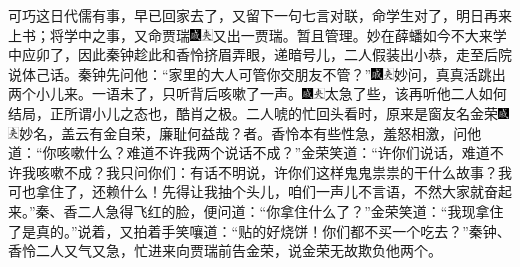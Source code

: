 可巧这日代儒有事，早已回家去了，又留下一句七言对联，命学生对了，明日再来上书；将学中之事，又命贾瑞{\includegraphics[width=3mm]{../Images/00005}\includegraphics[width=3mm]{../Images/00012}\footnotesize \kaishu 又出一贾瑞。}暂且管理。妙在薛蟠如今不大来学中应卯了，因此秦钟趁此和香怜挤眉弄眼，递暗号儿，二人假装出小恭，走至后院说体己话。秦钟先问他：“家里的大人可管你交朋友不管？”{\includegraphics[width=3mm]{../Images/00005}\includegraphics[width=3mm]{../Images/00012}\footnotesize \kaishu 妙问，真真活跳出两个小儿来。}一语未了，只听背后咳嗽了一声。{\includegraphics[width=3mm]{../Images/00005}\includegraphics[width=3mm]{../Images/00012}\footnotesize \kaishu 太急了些，该再听他二人如何结局，正所谓小儿之态也，酷肖之极。}二人唬的忙回头看时，原来是窗友名金荣{\includegraphics[width=3mm]{../Images/00005}\includegraphics[width=3mm]{../Images/00012}\footnotesize \kaishu 妙名，盖云有金自荣，廉耻何益哉？}者。香怜本有些性急，羞怒相激，问他道：“你咳嗽什么？难道不许我两个说话不成？”金荣笑道：“许你们说话，难道不许我咳嗽不成？我只问你们：有话不明说，许你们这样鬼鬼祟祟的干什么故事？我可也拿住了，还赖什么！先得让我抽个头儿，咱们一声儿不言语，不然大家就奋起来。”秦、香二人急得飞红的脸，便问道：“你拿住什么了？”金荣笑道：“我现拿住了是真的。”说着，又拍着手笑嚷道：“贴的好烧饼！你们都不买一个吃去？”秦钟、香怜二人又气又急，忙进来向贾瑞前告金荣，说金荣无故欺负他两个。

